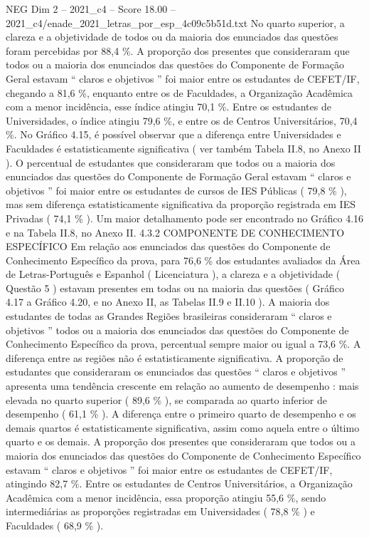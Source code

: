 \begin{textsample}{NEG Dim 2 – 2021\_c4 – Score 18.00 – 2021\_c4/enade\_2021\_letras\_por\_esp\_4c09c5b51d.txt}
No quarto superior, a clareza e a objetividade de todos ou da maioria dos enunciados das questões foram percebidas por 88,4 \%.
A proporção dos presentes que consideraram que todos ou a maioria dos enunciados das questões do Componente de Formação Geral estavam “ claros e objetivos ” foi maior entre os estudantes de CEFET/IF, chegando a 81,6 \%, enquanto entre os de Faculdades, a Organização Acadêmica com a menor incidência, esse índice atingiu 70,1 \%.
Entre os estudantes de Universidades, o índice atingiu 79,6 \%, e entre os de Centros Universitários, 70,4 \%.
No Gráfico 4.15, é possível observar que a diferença entre Universidades e Faculdades é estatisticamente significativa ( ver também Tabela II.8, no Anexo II ).
O percentual de estudantes que consideraram que todos ou a maioria dos enunciados das questões do Componente de Formação Geral estavam “ claros e objetivos ” foi maior entre os estudantes de cursos de IES Públicas ( 79,8 \% ), mas sem diferença estatisticamente significativa da proporção registrada em IES Privadas ( 74,1 \% ).
Um maior detalhamento pode ser encontrado no Gráfico 4.16 e na Tabela II.8, no Anexo II. 4.3.2 COMPONENTE DE CONHECIMENTO ESPECÍFICO Em relação aos enunciados das questões do Componente de Conhecimento Específico da prova, para 76,6 \% dos estudantes avaliados da Área de Letras-Português e Espanhol ( Licenciatura ), a clareza e a objetividade ( Questão 5 ) estavam presentes em todas ou na maioria das questões ( Gráfico 4.17 a Gráfico 4.20, e no Anexo II, as Tabelas II.9 e II.10 ).
A maioria dos estudantes de todas as Grandes Regiões brasileiras consideraram “ claros e objetivos ” todos ou a maioria dos enunciados das questões do Componente de Conhecimento Específico da prova, percentual sempre maior ou igual a 73,6 \%.
A diferença entre as regiões não é estatisticamente significativa.
A proporção de estudantes que consideraram os enunciados das questões “ claros e objetivos ” apresenta uma tendência crescente em relação ao aumento de desempenho : mais elevada no quarto superior ( 89,6 \% ), se comparada ao quarto inferior de desempenho ( 61,1 \% ).
A diferença entre o primeiro quarto de desempenho e os demais quartos é estatisticamente significativa, assim como aquela entre o último quarto e os demais.
A proporção dos presentes que consideraram que todos ou a maioria dos enunciados das questões do Componente de Conhecimento Específico estavam “ claros e objetivos ” foi maior entre os estudantes de CEFET/IF, atingindo 82,7 \%.
Entre os estudantes de Centros Universitários, a Organização Acadêmica com a menor incidência, essa proporção atingiu 55,6 \%, sendo intermediárias as proporções registradas em Universidades ( 78,8 \% ) e Faculdades ( 68,9 \% ).

\end{textsample}
